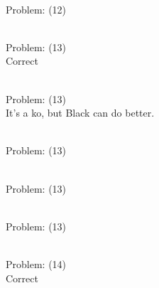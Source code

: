 \documentclass[11pt]{article}
\begin{document}
\begin{minipage}[t]{0.5\textwidth}
  {\centering
  
\\
Problem: (12)\\
  }
\end{minipage}
\begin{minipage}[t]{0.5\textwidth}
  {\centering
  
\\
Problem: (13)\\
Correct\\
  }
\end{minipage}
\begin{minipage}[t]{0.5\textwidth}
  {\centering
  
\\
Problem: (13)\\
It's a ko, but Black can do better.\\
  }
\end{minipage}
\begin{minipage}[t]{0.5\textwidth}
  {\centering
  
\\
Problem: (13)\\
  }
\end{minipage}
\begin{minipage}[t]{0.5\textwidth}
  {\centering
  
\\
Problem: (13)\\
  }
\end{minipage}
\begin{minipage}[t]{0.5\textwidth}
  {\centering
  
\\
Problem: (13)\\
  }
\end{minipage}
\begin{minipage}[t]{0.5\textwidth}
  {\centering
  
\\
Problem: (14)\\
Correct\\
  }
\end{minipage}
\end{document}
